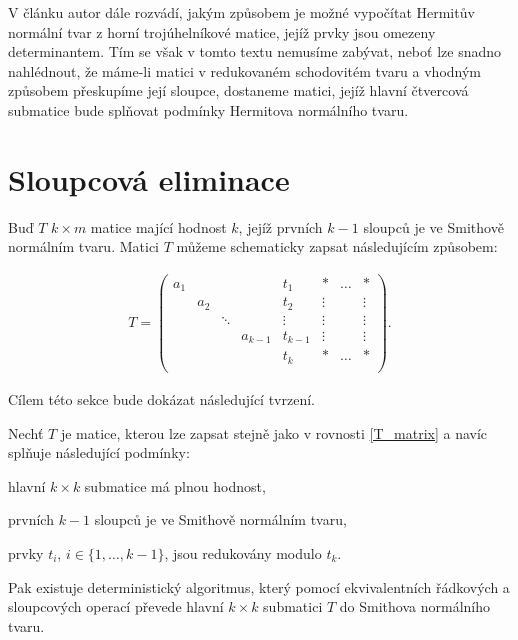V článku \cite{SNF_Arne} autor dále rozvádí, jakým způsobem je možné vypočítat
Hermitův normální tvar z horní trojúhelníkové matice, jejíž prvky jsou omezeny
determinantem. Tím se však v tomto textu nemusíme zabývat, neboť lze snadno
nahlédnout, že máme-li matici v redukovaném schodovitém tvaru a vhodným způsobem
přeskupíme její sloupce, dostaneme matici, jejíž hlavní čtvercová submatice bude
splňovat podmínky Hermitova normálního tvaru.

\section{Sloupcová eliminace}

Buď $ T $ $ k \times m $ matice mající hodnost $ k $, jejíž prvních $ k - 1 $
sloupců je ve Smithově normálním tvaru. Matici $ T $ můžeme schematicky zapsat
následujícím způsobem:

\begin{align} \label{T_matrix}
T =
    \left(
    \begin{array}{ccccc|ccc}
        a_1 &     &        &         & t_1     & \ast   & \hdots & \ast   \\
            & a_2 &        &         & t_2     & \vdots &        & \vdots \\
            &     & \ddots &         & \vdots  & \vdots &        & \vdots \\
            &     &        & a_{k-1} & t_{k-1} & \vdots &        & \vdots \\
            &     &        &         & t_k     & \ast   & \hdots & \ast   \\
    \end{array}
    \right)
.
\end{align}

Cílem této sekce bude dokázat následující tvrzení.

\begin{vet} \label{Sloup_elim}
Nechť $ T $ je matice, kterou lze zapsat stejně jako v rovnosti \ref{T_matrix}
a navíc splňuje následující podmínky:
\begin{Cond}[series=Sloup_elim_CONDS]
    \item hlavní $ k \times k $ submatice má plnou hodnost,
    \item prvních $ k - 1 $ sloupců je ve Smithově normálním tvaru,
    \item prvky $ t_i $, $ i \in \{1,\dots, k-1\} $, jsou redukovány modulo $ t_k $.
\end{Cond}
Pak existuje deterministický algoritmus, který pomocí ekvivalentních řádkových
a sloupcových operací převede hlavní $ k \times k $ submatici $ T $ do
Smithova normálního tvaru.
\end{vet}

